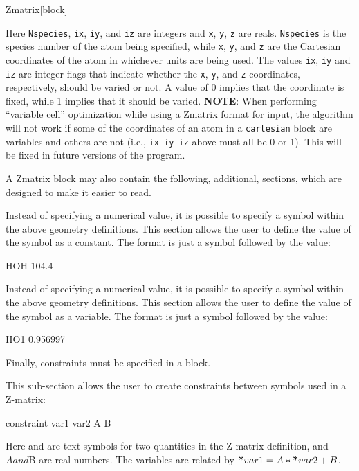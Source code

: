 \begin{fdfentry}{Zmatrix}[block]
\begin{fdfoptions}
    Here \texttt{Nspecies}, \texttt{ix}, \texttt{iy}, and \texttt{iz} are
    integers and \texttt{x}, \texttt{y}, \texttt{z} are
    reals. \texttt{Nspecies} is the species number of the atom being
    specified, while \texttt{x}, \texttt{y}, and \texttt{z} are the
    Cartesian coordinates of the atom in whichever units are being
    used. The values \texttt{ix}, \texttt{iy} and \texttt{iz} are integer
    flags that indicate whether the \texttt{x}, \texttt{y}, and \texttt{z}
    coordinates, respectively, should be varied or not. A value of 0
    implies that the coordinate is fixed, while 1 implies that it should
    be varied.  \textbf{NOTE}: When performing ``variable cell''
    optimization while using a Zmatrix format for input, the algorithm
    will not work if some of the coordinates of an atom in a
    \texttt{cartesian} block are variables and others are not (i.e.,
    \texttt{ix iy iz} above must all be 0 or 1). This will be fixed in
    future versions of the program.

    A Zmatrix block may also contain the following, additional, sections, which
    are designed to make it easier to read.
    

    \option[constants]%
    Instead of specifying a numerical value, it is possible to specify
    a symbol within the above geometry definitions. This section
    allows the user to define the value of the symbol as a
    constant. The format is just a symbol followed by the value:
    \begin{fdfexample}
      HOH 104.4
    \end{fdfexample}


    \option[variables]%
    Instead of specifying a numerical value, it is possible to specify
    a symbol within the above geometry definitions. This section
    allows the user to define the value of the symbol as a
    variable. The format is just a symbol followed by the value:
    \begin{fdfexample}
      HO1 0.956997
    \end{fdfexample}
    
    Finally, constraints must be specified in a  block.

    
    \option[constraint]%
    This sub-section allows the user to create
    constraints between symbols used in a Z-matrix:
    \begin{fdfexample}
      constraint
        var1 var2 A B
    \end{fdfexample}
    Here  and  are text symbols for two
    quantities in the Z-matrix definition, and $A and $B are real
    numbers. The variables are related by $\textbf{*}{var1} = A*\textbf{*}{var2}
    + B$.
    

\end{fdfoptions}
\end{fdfentry}
